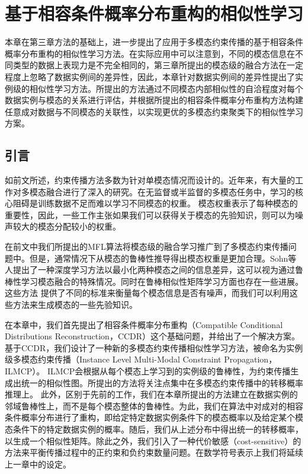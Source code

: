\chapter{基于相容条件概率分布重构的相似性学习}
本章在第三章方法的基础上，进一步提出了应用于多模态约束传播的基于相容条件概率分布重构的相似性学习方法。在实际应用中可以注意到，不同的模态信息在不同类型的数据上表现力是不完全相同的，第三章所提出的模态级的融合方法在一定程度上忽略了数据实例间的差异性，因此，本章针对数据实例间的差异性提出了实例级的相似性学习方法。所提出的方法通过不同模态内部相似性的自洽程度对每个数据实例与模态的关系进行评估，并根据所提出的相容条件概率分布重构方法构建任意成对数据与不同模态的关联性，以实现更优的多模态约束聚类下的相似性学习方案。
\section{引言}
如前文所述，约束传播方法多数为针对单模态情况而设计的。近年来，有大量的工作对多模态融合进行了深入的研究\cite{lahat2015multimodal,poria2017ensemble,yu2017deep,poria2017review,liu2018weakly,kiela2018efficient}。在无监督或半监督的多模态任务中，学习的核心阻碍是训练数据不足而难以学习不同模态的权重。
模态权重表示了每种模态的重要性，因此，一些工作主张如果我们可以获得关于模态的先验知识，则可以为噪声较大的模态分配较小的权重\cite{kumar2011co,liu2013multi}。

在前文中我们所提出的MFL算法将模态级的融合学习推广到了多模态约束传播问题中。但是，通常情况下从模态的鲁棒性推导得出模态权重是更加合理。Sohn等人提出了一种深度学习方法以最小化两种模态之间的信息差异\cite{sohn2014improved}，这可以视为通过鲁棒性学习模态融合的特殊情况。同时在鲁棒相似性矩阵学习方面也存在一些进展\cite{pavan2007dominant,premachandran2013consensus,zhu2014constructing}。这些方法
提供了不同的标准来衡量每个模态信息是否有噪声，而我们可以利用这些方法来生成模态的一些先验知识。

在本章中，我们首先提出了相容条件概率分布重构（Compatible Conditional Distributions Reconstruction，CCDR）这个基础问题，并给出了一个解决方案。基于CCDR，我们设计了一种新的多模态约束传播相似性学习方法，被命名为实例级多模态约束传播（Instance Level Multi-Modal Constraint Propagation，ILMCP）。
ILMCP会根据从每个模态上学习到的实例级的鲁棒性，为约束传播生成出统一的相似性图。所提出的方法将关注点集中在多模态约束传播中的转移概率推理上。
此外，区别于先前的工作，我们在本章所提出的方法建立在数据实例的邻域鲁棒性上，而不是每个模态整体的鲁棒性。为此，我们在算法中对成对的相容条件概率分布进行了重构，即给定特定数据实例条件下的模态概率以及给定某个模态条件下的特定数据实例的概率。随后，我们从上述分布中得出统一的转移概率，以生成一个相似性矩阵。除此之外，我们引入了一种代价敏感（cost-sensitive）的方法来平衡传播过程中的正约束和负约束数量问题。在数学符号表示上我们将延续上一章中的设定。

